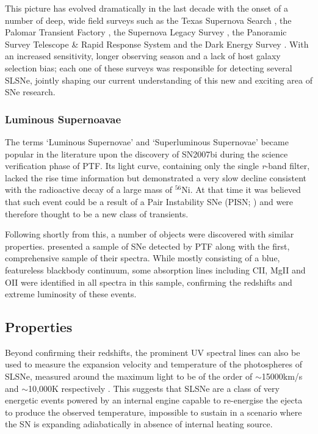 This picture has evolved dramatically in the last decade with the onset of a number of deep, wide field surveys such as the Texas Supernova Search \citep[TSS;][]{Quimby2006}, the Palomar Transient Factory \citep[PTF;][]{Law2009, Rau2009}, the Supernova Legacy Survey \citep[SNLS;][]{Astier2005,Guy2010,Perrett2010}, the Panoramic Survey Telescope \& Rapid Response System \citep[Pan-STARRS;][]{Kaiser2010} and the Dark Energy Survey \citep[DES;][]{Flaugher2005}. With an increased sensitivity, longer observing season and a lack of host galaxy selection bias; each one of these surveys was responsible for detecting several SLSNe, jointly shaping our current understanding of this new and exciting area of SNe research.

\subsubsection{Luminous Supernoavae}
The terms `Luminous Supernovae' and `Superluminous Supernovae' became popular in the literature upon the discovery of SN2007bi \citep{Gal-Yam2009} during the science verification phase of PTF. Its light curve, containing only the single \textit{r}-band filter, lacked the rise time information but demonstrated a very slow decline consistent with the radioactive decay of a large mass of $^{56}$Ni. At that time it was believed that such event could be a result of a Pair Instability SNe (PISN; ) and were therefore thought to be a new class of transients.

Following shortly from this, a number of objects were discovered with similar properties. \citet{Quimby2009} presented a sample of SNe detected by PTF along with the first, comprehensive sample of their spectra. While mostly consisting of a blue, featureless blackbody continuum, some absorption lines including CII, MgII and OII \citep[see ][for more recent line identification]{Mazzali2015a} were identified in all spectra in this sample, confirming the redshifts and extreme luminosity of these events.

\subsection{Properties}
Beyond confirming their redshifts, the prominent UV spectral lines can also be used to measure the expansion velocity and temperature of the photospheres of SLSNe, measured around the maximum light to be of the order of $\sim$15000km/s and $\sim$10,000K respectively \citep{Inserra2013}. This suggests that SLSNe are a class of very energetic events powered by an internal engine capable to re-energise the ejecta to produce the observed temperature, impossible to sustain in a scenario where the SN is expanding adiabatically in absence of internal heating source.

